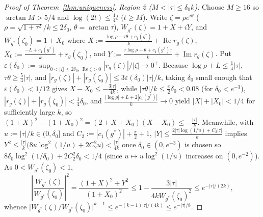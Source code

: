 \documentclass[11pt, reqno]{amsart}
\theoremstyle{remark}
\numberwithin{equation}{section}
\DeclareMathOperator{\re}{Re}
\DeclareMathOperator{\im}{Im}
\begin{document}
\begin{proof}[Proof of Theorem~\ref{thm:uniqueness}]
\emph{Region 2 ($M < |\tau| \le \delta_0 k$):} Choose $M \ge 16$ so $\arctan M > 5/4$ and
$\log(2t) \le \frac{1}{4} t$ ($t \ge M$). Write $\zeta = \rho e^{i\theta}$ ($\rho = \sqrt{1+\tau^2}/k \le 2\delta_0$,
$\theta = \arctan\tau$), $W_{g^*}(\zeta) = 1 + X + i Y$, and $W_{g^*}(\zeta_0) = 1 + X_0$ where
$X := \frac{\log\rho - \tau\theta + c_1(g^*)}{k} + \re r_g(\zeta)$,
$X_0 := \frac{-L + c_1(g^*)}{k} + r_g(\zeta_0)$, and
$Y := \frac{\tau\log\rho + \theta + c_1(g^*)\tau}{k} + \im r_g(\zeta)$.
Put $\varepsilon(\delta_0) := \sup_{0 < |\zeta| \le 2\delta_0,\, \re\zeta > 0} |r_g(\zeta)|/|\zeta| \to 0^+$.
Because $\log\rho + L \le \frac{1}{4}|\tau|$, $\tau\theta \ge \frac{5}{4}|\tau|$, and
$|r_g(\zeta)| + |r_g(\zeta_0)| \le 3\varepsilon(\delta_0)|\tau|/k$, taking $\delta_0$ small enough
that $\varepsilon(\delta_0) < 1/12$ gives $X - X_0 \le -\frac{3|\tau|}{4k}$, while
$|\tau\theta|/k \le \frac{\pi}{2}\delta_0 < 0.08$ (for $\delta_0 < e^{-3}$),
$|r_g(\zeta)|+|r_g(\zeta_0)| < \frac{1}{4}\delta_0$, and $\frac{|\log\rho|+L+2|c_1(g^*)|}{k} \to 0$
yield $|X| + |X_0| < 1/4$ for sufficiently large $k$, so
$(1+X)^2 - (1+X_0)^2 = (2+X+X_0)(X-X_0) \le -\frac{|\tau|}{k}$. Meanwhile, with
$u := |\tau|/k \in (0,\delta_0]$ and $C_2 := |c_1(g^*)| + \frac{\pi}{2} + 1$,
$|Y| \le \frac{2|\tau|\log(1/u) + C_2|\tau|}{k}$ implies
$Y^2 \le \frac{|\tau|}{k}\bigl(8 u\log^2(1/u) + 2 C_2^2 u\bigr) < \frac{|\tau|}{4k}$
once $\delta_0 \in (0, e^{-3})$ is chosen so $8\delta_0\log^2(1/\delta_0) + 2 C_2^2\delta_0 < 1/4$
(since $u \mapsto u\log^2(1/u)$ increases on $(0, e^{-2})$). As $0 < W_{g^*}(\zeta_0) < 1$,
\[
\left|\frac{W_{g^*}(\zeta)}{W_{g^*}(\zeta_0)}\right|^2
= \frac{(1+X)^2 + Y^2}{(1+X_0)^2} \le 1 - \frac{3|\tau|}{4k W_{g^*}(\zeta_0)^2} \le e^{-|\tau|/(2k)},
\]
whence $\bigl|W_{g^*}(\zeta)/W_{g^*}(\zeta_0)\bigr|^{k-1} \le e^{-(k-1)|\tau|/(4k)} \le e^{-|\tau|/8}$.


\end{proof}
\end{document}
